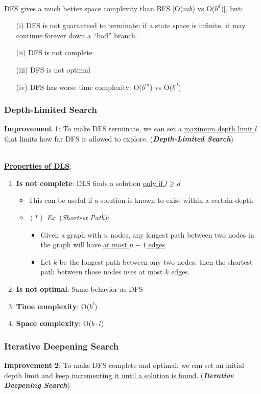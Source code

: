 \documentclass[12pt]{extarticle}
\theoremstyle{definition}
\theoremstyle{remark}
\newcommand{\term}[1]{\noindent\textbf{\textit{#1}}}
\newcommand{\titleul}[1]{\noindent \textbf{\ul{#1}}}
\begin{document}
~\\
DFS gives a much better space complexity than BFS [O($mb$) vs O($b^d$)], but: \begin{itemize}
    \item[(i)] DFS is not guaranteed to terminate: if a state space is infinite, it may continue forever down a ``bad'' branch.
    \item[(ii)] DFS is not complete
    \item[(iii)] DFS is not optimal
    \item[(iv)] DFS has worse time complexity: O($b^m$) vs O($b^d$)
\end{itemize}

\subsubsection{Depth-Limited Search}
\textbf{Improvement 1}: To make DFS terminate, we can set a \ul{maximum depth limit $l$} that limits how far DFS is allowed to explore. (\term{Depth-Limited Search})

~\\
\titleul{Properties of DLS}: \begin{enumerate}
    \item \textbf{Is not complete}: DLS finds a solution \ul{only if $l\geq d$} \begin{itemize}
        \item This can be useful if a solution is known to exist within a certain depth
        \item $(\ast)$ \textit{Ex}. (\textit{Shortest Path}): \begin{itemize}
            \item Given a graph with $n$ nodes, any longest path between two nodes in the graph will have \ul{at most $n-1$ edges}
            \item Let $k$ be the longest path between any two nodes; then the shortest path between those nodes uses at most $k$ edges.
        \end{itemize}
    \end{itemize}
    \item \textbf{Is not optimal}: Same behavior as DFS
    \item \textbf{Time complexity}: O($b^l$)
    \item \textbf{Space complexity}: O($b\cdot l$)
\end{enumerate}

\subsubsection{Iterative Deepening Search}
\textbf{Improvement 2}: To make DFS complete and optimal: we can set an initial depth limit and \ul{keep incrementing it until a solution is found}. (\term{Iterative Deepening Search})
\end{document}
